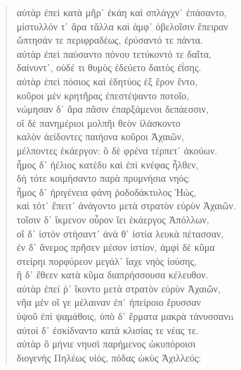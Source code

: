 \begin{Spacing}{1.5}
\begin{verse}
{\large\g αὐτὰρ ἐπεὶ κατὰ μῆρ᾽ ἐκάη καὶ σπλάγχν᾽ ἐπάσαντο,  } \\
{\large\g μίστυλλόν τ᾽ ἄρα τἄλλα καὶ ἀμφ᾽ ὀβελοῖσιν ἔπειραν  } \\
{\large\g ὤπτησάν τε περιφραδέως, ἐρύσαντό τε πάντα.  } \\
{\large\g αὐτὰρ ἐπεὶ παύσαντο πόνου τετύκοντό τε δαῖτα,  } \\
{\large\g δαίνυντ᾽, οὐδέ τι θυμὸς ἐδεύετο δαιτὸς ἐΐσης.  } \\
{\large\g αὐτὰρ ἐπεὶ πόσιος καὶ ἐδητύος ἐξ ἔρον ἕντο,  } \\
{\large\g κοῦροι μὲν κρητῆρας ἐπεστέψαντο ποτοῖο,  } \\
{\large\g νώμησαν δ᾽ ἄρα πᾶσιν ἐπαρξάμενοι δεπάεσσιν,  } \\
{\large\g οἳ δὲ πανημέριοι μολπῆι θεὸν ἱλάσκοντο  } \\
{\large\g καλὸν ἀείδοντες παιήονα κοῦροι Ἀχαιῶν,  } \\
{\large\g μέλποντες ἑκάεργον: ὃ δὲ φρένα τέρπετ᾽ ἀκούων.  } \\
{\large\g ἦμος δ᾽ ἠέλιος κατέδυ καὶ ἐπὶ κνέφας ἦλθεν,  } \\
{\large\g δὴ τότε κοιμήσαντο παρὰ πρυμνήσια νηός:  } \\
{\large\g ἦμος δ᾽ ἠριγένεια φάνη ῥοδοδάκτυλος Ἠώς,  } \\
{\large\g καὶ τότ᾽ ἔπειτ᾽ ἀνάγοντο μετὰ στρατὸν εὐρὺν Ἀχαιῶν.  } \\
{\large\g τοῖσιν δ᾽ ἴκμενον οὖρον ἵει ἑκάεργος Ἀπόλλων,  } \\
{\large\g οἳ δ᾽ ἱστὸν στήσαντ᾽ ἀνά θ᾽ ἱστία λευκὰ πέτασσαν,  } \\
{\large\g ἐν δ᾽ ἄνεμος πρῆσεν μέσον ἱστίον, ἀμφὶ δὲ κῦμα  } \\
{\large\g στείρηι πορφύρεον μεγάλ᾽ ἴαχε νηὸς ἰούσης,  } \\
{\large\g ἣ δ᾽ ἔθεεν κατὰ κῦμα διαπρήσσουσα κέλευθον.  } \\
{\large\g αὐτὰρ ἐπεί ῥ᾽ ἵκοντο μετὰ στρατὸν εὐρὺν Ἀχαιῶν,  } \\
{\large\g νῆα μὲν οἵ γε μέλαιναν ἐπ᾽ ἠπείροιο ἔρυσσαν  } \\
{\large\g ὑψοῦ ἐπὶ ψαμάθοις, ὑπὸ δ᾽ ἕρματα μακρὰ τάνυσσανn  } \\
{\large\g αὐτοὶ δ᾽ ἐσκίδναντο κατὰ κλισίας τε νέας τε.  } \\
{\large\g αὐτὰρ ὃ μήνιε νηυσὶ παρήμενος ὠκυπόροισι  } \\
{\large\g διογενὴς Πηλέως υἱός, πόδας ὠκὺς Ἀχιλλεύς:  } \\

\end{verse}
\end{Spacing}
